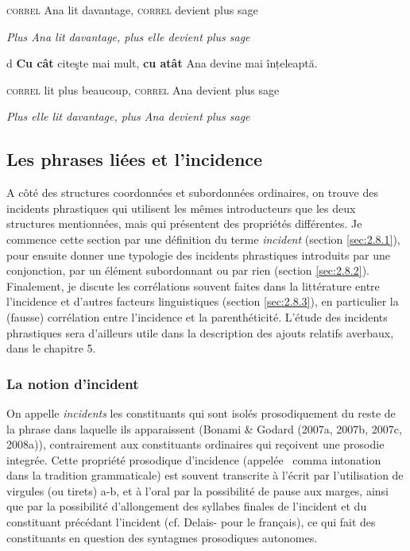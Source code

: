     \textsc{correl}  Ana  lit  davantage,  \textsc{correl } devient  plus  sage

    \textit{Plus Ana lit davantage, plus elle devient plus sage} 

  d  \textbf{Cu cât } citeşte  mai mult,  \textbf{cu atât } Ana  devine  mai  înțeleaptă.

    \textsc{correl}  lit plus  beaucoup,  \textsc{correl}  Ana  devient  plus  sage

    \textit{Plus elle lit davantage, plus Ana devient plus sage}

\subsection{Les phrases liées et l'incidence}
\label{bkm:Ref302035390}\label{bkm:Ref302037872}\label{bkm:Ref301443208}A côté des structures coordonnées et subordonnées ordinaires, on trouve des incidents phrastiques qui utilisent les mêmes introducteurs que les deux structures mentionnées, mais qui présentent des propriétés différentes. Je commence cette section par une définition du terme \textit{incident} (section \ref{sec:2.8.1}), pour ensuite donner une typologie des incidents phrastiques introduits par une conjonction, par un élément subordonnant ou par rien (section \ref{sec:2.8.2}). Finalement, je discute les corrélations souvent faites dans la littérature entre l'incidence et d'autres facteurs linguistiques (section \ref{sec:2.8.3}), en particulier la (fausse) corrélation entre l'incidence et la parenthéticité. L'étude des incidents phrastiques sera d'ailleurs utile dans la description des ajouts relatifs averbaux, dans le chapitre 5. 

\subsubsection{La notion d'incident}
\label{bkm:Ref301534217}On appelle \textit{incidents} les constituants qui sont isolés prosodiquement du reste de la phrase dans laquelle ils apparaissent (Bonami \& Godard (2007a, 2007b, 2007c, 2008a)), contrairement aux constituants ordinaires qui reçoivent une prosodie integrée. Cette propriété prosodique d'incidence (appelée {\guillemotleft}~comma intonation~{\guillemotright} dans la tradition grammaticale) est souvent transcrite à l'écrit par l'utilisation de virgules (ou tirets) a-b, et à l'oral par la possibilité de pause aux marges, ainsi que par la possibilité d'allongement des syllabes finales de l'incident et du constituant précédant l'incident (cf. Delais-\citet{Roussarie2005} pour le français), ce qui fait des constituants en question des syntagmes prosodiques autonomes. 


